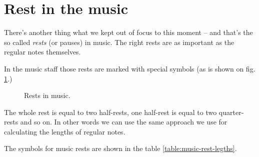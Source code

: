 \documentclass[../sparc.tex]{subfiles}
\begin{document}
\section{Rest in the music}

There's another thing what we kept out of focus to this moment -- and that's the
so called \emph{rests} (or pauses) in music.  The right rests are as important
as the regular notes themselves.

In the music staff those rests are marked with special symbols (as is shown on
fig. \ref{fig:lilypond-rest-example-1}.)

\begin{figure}[ht]
  \centering
  \caption{Rests in music.}
  \label{fig:lilypond-rest-example-1}
\end{figure}

The whole rest is equal to two half-rests, one half-rest is equal to two
quarter-rests and so on.  In other words we can use the same approach we use for
calculating the lengths of regular notes.

The symbols for music rests are shown in the table
\ref{table:music-rest-legths}.
\end{document}
